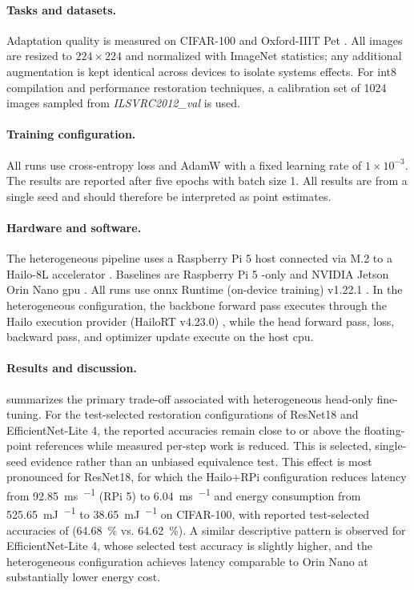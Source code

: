 \paragraph{Tasks and datasets.} Adaptation quality is measured on CIFAR-100 \cite{Krizhevsky09learningmultiple} and Oxford-IIIT Pet \cite{parkhi12a}. All images are resized to $224\times224$ and normalized with ImageNet statistics; any additional augmentation is kept identical across devices to isolate systems effects. For \gls{int8} compilation and performance restoration techniques, a calibration set of \num{1024} images sampled from \textit{ILSVRC2012\_val} \cite{deng2009imagenet} is used.

\paragraph{Training configuration.} All runs use cross-entropy loss and AdamW with a fixed learning rate of $1\times10^{-3}$. The results are reported after five epochs with batch size 1. All results are from a single seed and should therefore be interpreted as point estimates.

\paragraph{Hardware and software.} The heterogeneous pipeline uses a Raspberry Pi 5 host \cite{raspberrypi5} connected via M.2 to a Hailo-8L accelerator \cite{hailo-8l}. Baselines are Raspberry Pi 5 -only and NVIDIA Jetson Orin Nano \gls{gpu} \cite{jetson-orin-nano}. All runs use \gls{onnx} Runtime (on-device training) v1.22.1 \cite{onnxruntime}. In the heterogeneous configuration, the backbone forward pass executes through the Hailo execution provider (HailoRT v4.23.0) \cite{hailort}, while the head forward pass, loss, backward pass, and optimizer update execute on the host \gls{cpu}.

\paragraph{Results and discussion.}  summarizes the primary trade-off associated with heterogeneous head-only fine-tuning. For the test-selected restoration configurations of ResNet18 and EfficientNet-Lite 4, the reported accuracies remain close to or above the floating-point references while measured per-step work is reduced. This is selected, single-seed evidence rather than an unbiased equivalence test. This effect is most pronounced for ResNet18, for which the Hailo+RPi configuration reduces latency from \SI{92.85}{\milli\second\per\step} (RPi 5) to \SI{6.04}{\milli\second\per\step} and energy consumption from \SI{525.65}{\milli\joule\per\step} to \SI{38.65}{\milli\joule\per\step} on CIFAR-100, with reported test-selected accuracies of (\SI{64.68}{\percent} vs. \SI{64.62}{\percent}). A similar descriptive pattern is observed for EfficientNet-Lite 4, whose selected test accuracy is slightly higher, and the heterogeneous configuration achieves latency comparable to Orin Nano at substantially lower energy cost.

